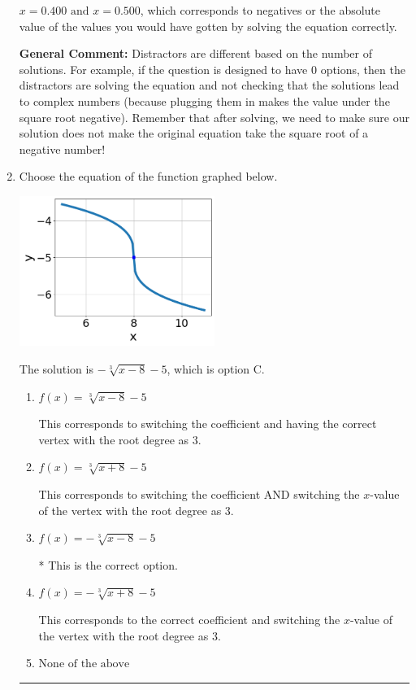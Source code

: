 \documentclass{extbook}[14pt]
\newcommand{\litem}[1]{\item #1

\rule{\textwidth}{0.4pt}}
\begin{document}
\begin{enumerate}
{\begin{enumerate}[label=\Alph*.]
$x = 0.400 \text{ and } x = 0.500$, which corresponds to negatives or the absolute value of the values you would have gotten by solving the equation correctly.
\end{enumerate}

\textbf{General Comment:} Distractors are different based on the number of solutions. For example, if the question is designed to have 0 options, then the distractors are solving the equation and not checking that the solutions lead to complex numbers (because plugging them in makes the value under the square root negative). Remember that after solving, we need to make sure our solution does not make the original equation take the square root of a negative number!
}
\litem{
Choose the equation of the function graphed below.

\begin{center}
    \includegraphics[width=0.5\textwidth]{../Figures/radicalGraphToEquationC.png}
\end{center}


The solution is \( - \sqrt[3]{x - 8} - 5 \), which is option C.\begin{enumerate}[label=\Alph*.]
\item \( f(x) = \sqrt[3]{x - 8} - 5 \)

This corresponds to switching the coefficient and having the correct vertex with the root degree as $3$.
\item \( f(x) = \sqrt[3]{x + 8} - 5 \)

This corresponds to switching the coefficient AND switching the $x$-value of the vertex with the root degree as $3$.
\item \( f(x) = - \sqrt[3]{x - 8} - 5 \)

* This is the correct option.
\item \( f(x) = - \sqrt[3]{x + 8} - 5 \)

This corresponds to the correct coefficient and switching the $x$-value of the vertex with the root degree as $3$.
\item \( \text{None of the above} \)


\end{enumerate}}
\end{enumerate}
\end{document}
